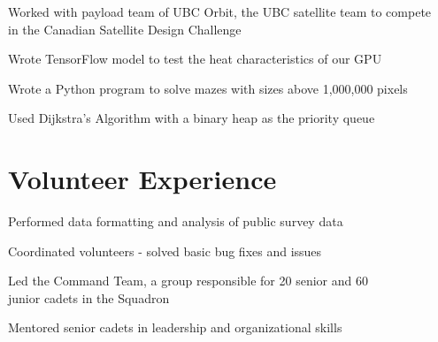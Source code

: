 \documentclass[]{deedy-resume-openfont}
\begin{document}
    \begin{tightemize}
    \item Worked with payload team of UBC Orbit, the UBC satellite team to compete \\ in the Canadian Satellite Design Challenge 
    \item Wrote TensorFlow model to test the heat characteristics of our GPU 
    \end{tightemize}
    \sectionsep
    
    \begin{tightemize}
    \item Wrote a Python program to solve mazes with sizes above 1,000,000 pixels
    \item Used Dijkstra’s Algorithm with a binary heap as the priority queue
    \end{tightemize}
    \sectionsep
    
    
    \section{Volunteer Experience}
    \begin{tightemize}
    \item Performed data formatting and analysis of public survey data
    \item Coordinated volunteers - solved basic bug fixes and issues
    \end{tightemize}
    \sectionsep
    
    \begin{tightemize}
    \item Led the Command Team, a group responsible for 20 senior and 60 \\  junior cadets in the Squadron 
    \item Mentored senior cadets in leadership and organizational skills
    \end{tightemize}
    \sectionsep
    
\end{document}
